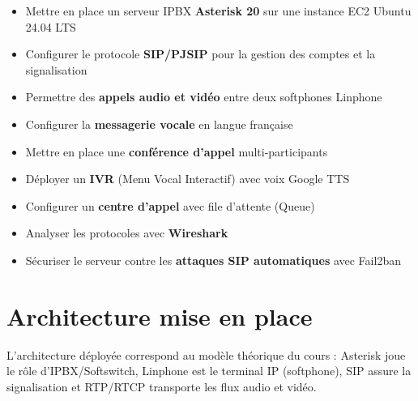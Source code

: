 \documentclass[a4paper,11pt]{report}
\begin{document}
\begin{infobox}[Objectifs du TP]
\begin{itemize}[leftmargin=1.2em, itemsep=2pt]
  \item Mettre en place un serveur IPBX \textbf{Asterisk 20} sur une instance EC2 Ubuntu 24.04 LTS
  \item Configurer le protocole \textbf{SIP/PJSIP} pour la gestion des comptes et la signalisation
  \item Permettre des \textbf{appels audio et vidéo} entre deux softphones Linphone
  \item Configurer la \textbf{messagerie vocale} en langue française
  \item Mettre en place une \textbf{conférence d'appel} multi-participants
  \item Déployer un \textbf{IVR} (Menu Vocal Interactif) avec voix Google TTS
  \item Configurer un \textbf{centre d'appel} avec file d'attente (Queue)
  \item Analyser les protocoles avec \textbf{Wireshark}
  \item Sécuriser le serveur contre les \textbf{attaques SIP automatiques} avec Fail2ban
\end{itemize}
\end{infobox}

\section{Architecture mise en place}

L'architecture déployée correspond au modèle théorique du cours : Asterisk joue le rôle d'IPBX/Softswitch, Linphone est le terminal IP (softphone), SIP assure la signalisation et RTP/RTCP transporte les flux audio et vidéo.
\end{document}
